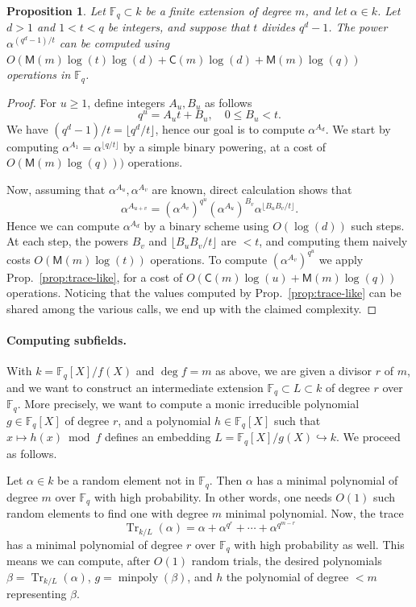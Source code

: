 \documentclass[12pt]{article}
\theoremstyle{plain}
\newtheorem{proposition}[theorem]{Proposition}
\theoremstyle{definition}
\DeclareMathOperator{\trace}{Tr} %
\DeclareMathOperator{\minpoly}{minpoly}
\def\F{\ensuremath{\mathbb{F}}}
\def\MM{\ensuremath{\mathsf{M}}}
\def\CC{\ensuremath{\mathsf{C}}}
\begin{document}
\begin{proposition}
  \label{prop:large-power}
  Let $\F_q \subset k$ be a finite extension of degree $m$, and let
  $\alpha\in k$. Let $d>1$ and $1<t<q$ be integers, and suppose that
  $t$ divides $q^d-1$. The power $\alpha^{(q^d-1)/t}$ can be computed
  using $O(\MM(m)\log(t)\log(d) + \CC(m)\log(d) + \MM(m)\log(q))$
  operations in $\F_q$.
\end{proposition}
\begin{proof}
  For $u \ge 1$, define integers $A_u, B_u$ as follows
  \begin{equation*}
    q^u = A_ut + B_u, \quad 0\le B_u < t.
  \end{equation*}
  We have $(q^d-1)/t = \lfloor q^d / t \rfloor$, hence our goal is to
  compute $\alpha^{A_d}$. We start by computing
  $\alpha^{A_1} = \alpha^{\lfloor q / t\rfloor}$ by a simple binary
  powering, at a cost of $O(\MM(m)\log(q)))$ operations.

  Now, assuming that $\alpha^{A_u}, \alpha^{A_v}$ are known, direct
  calculation shows that
  \[ \alpha^{A_{u + v}} = 
    \left(\alpha^{A_v}\right)^{q^u}\left(\alpha^{A_u}\right)^{B_v}\alpha^{\lfloor B_uB_v / t \rfloor}. 
  \]
  Hence we can compute $\alpha^{A_d}$ by a binary scheme using
  $O(\log(d))$ such steps. %
  At each step, the powers $B_v$ and $\lfloor B_uB_v / t \rfloor$ are
  $<t$, and computing them naively costs $O(\MM(m)\log(t))$
  operations. %
  To compute $\left(\alpha^{A_v}\right)^{q^u}$ we apply
  Prop.~\ref{prop:trace-like}, for a cost of
  $O(\CC(m)\log(u) + \MM(m)\log(q))$ operations. %
  Noticing that the values computed by Prop.~\ref{prop:trace-like} can
  be shared among the various calls, we end up with the claimed
  complexity.
\end{proof}


\paragraph{Computing subfields.}
With $k = \F_q[X]/f(X)$ and $\deg f=m$ as above, we are given a
divisor $r$ of $m$, and we want to construct an intermediate extension
$\F_q \subset L \subset k$ of degree $r$ over $\F_q$. More precisely,
we want to compute a monic irreducible polynomial $g \in \F_q[X]$ of
degree $r$, and a polynomial $h \in \F_q[X]$ such that
$x \mapsto h(x)\bmod f$ defines an embedding
$L = \F_q[X] / g(X) \hookrightarrow k$. We proceed as follows.

Let $\alpha\in k$ be a random element not in $\F_q$. Then $\alpha$ has a minimal polynomial of degree $m$ 
over $\F_q$ with high probability. In other words, one needs $O(1)$ such random elements to find 
one with degree $m$ minimal polynomial. Now, the trace
\begin{equation}
	\label{equ:trace-simple}
	\trace_{k/L}(\alpha) = \alpha + \alpha^{q^r} + \cdots + \alpha^{q^{m - r}}
\end{equation}
has a minimal polynomial of degree $r$ over $\F_q$ with high
probability as well. This means we can compute, after $O(1)$ random
trials, the desired polynomials $\beta = \trace_{k/L}(\alpha)$,
$g = \minpoly(\beta)$, and $h$ the polynomial of degree $<m$ representing $\beta$.
\end{document}
